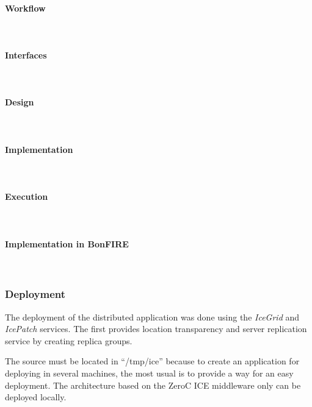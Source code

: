 \paragraph{Workflow}~\\

\paragraph{Interfaces}~\\

\paragraph{Design}~\\


\paragraph{Implementation}~\\

\paragraph{Execution}~\\

\paragraph{Implementation in BonFIRE}~\\



\subsubsection{Deployment}

The deployment of the distributed application was done using the \emph{IceGrid}
and \emph{IcePatch} services. The first provides location transparency and
server replication service by creating replica groups. 


The source must be located in ``/tmp/ice'' because to create an application for
deploying in several machines, the most usual is to provide a way for an easy
deployment. 
The architecture based on the ZeroC ICE middleware only can be deployed
locally.  
